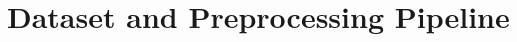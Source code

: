 \documentclass[conference]{IEEEtran}
\begin{document}




\section{Dataset and Preprocessing Pipeline}
\label{sec:dataset_preprocessing}













\end{document}
